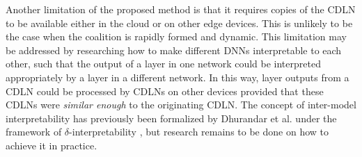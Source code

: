 Another limitation of the proposed method is that it requires copies of the CDLN to be available either in the cloud or on other edge devices. This is unlikely to be the case when the coalition is rapidly formed and dynamic. This limitation may be addressed by researching how to make different DNNs interpretable to each other, such that the output of a layer in one network could be interpreted appropriately by a layer in a different network. In this way, layer outputs from a CDLN could be processed by CDLNs on other devices provided that these CDLNs were \textit{similar enough} to the originating CDLN. The concept of inter-model interpretability has previously been formalized by Dhurandar et al. under the framework of \(\delta\)-interpretability \cite{deltaInterpretability,TIPInterpretability}, but research remains to be done on how to achieve it in practice.

